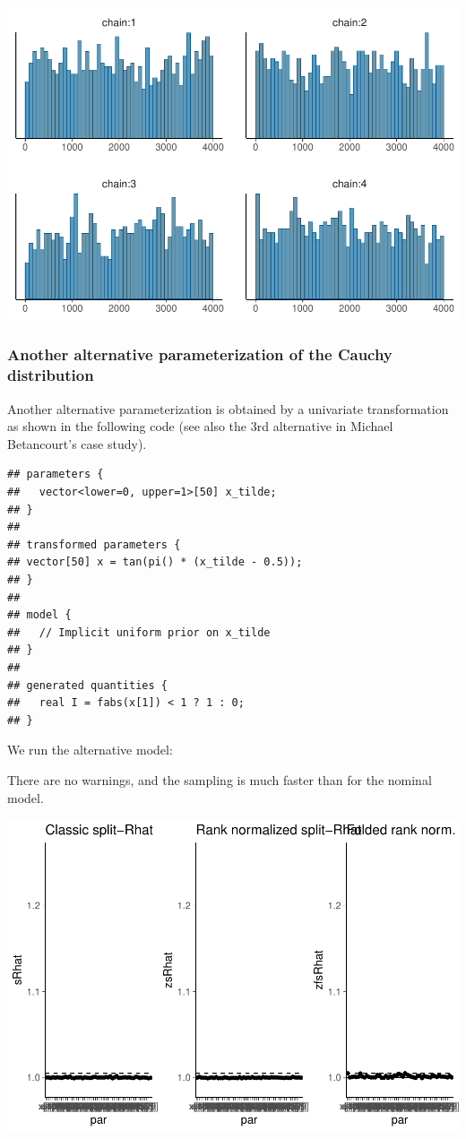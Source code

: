 \documentclass[american,]{article}
\begin{document}
\includegraphics{graphics/hist-fit-alt1-lp-1.pdf}

\hypertarget{another-alternative-parameterization-of-the-cauchy-distribution}{%
\subsubsection*{Another alternative parameterization of the Cauchy
distribution}\label{another-alternative-parameterization-of-the-cauchy-distribution}}

Another alternative parameterization is obtained by a univariate
transformation as shown in the following code (see also the 3rd
alternative in Michael Betancourt's case study).

\begin{verbatim}
## parameters {
##   vector<lower=0, upper=1>[50] x_tilde;
## }
## 
## transformed parameters {
## vector[50] x = tan(pi() * (x_tilde - 0.5));
## }
## 
## model {
##   // Implicit uniform prior on x_tilde
## }
## 
## generated quantities {
##   real I = fabs(x[1]) < 1 ? 1 : 0;
## }
\end{verbatim}

We run the alternative model:

There are no warnings, and the sampling is much faster than for the
nominal model.

\includegraphics{graphics/rhat-fit-alt3-1.pdf}
\end{document}
